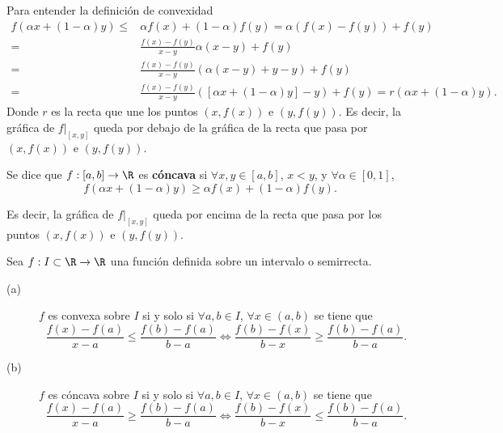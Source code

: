 \begin{observation}
\normalfont Para entender la definición de convexidad
\[
\begin{split}
	f\left(\alpha x + \left(1-\alpha \right)y\right) \leq & \alpha f\left(x\right) + \left(1-\alpha \right)f\left(y\right) =  \alpha \left(f\left(x\right)-f\left(y\right)\right) + f\left(y\right) \\
	= & \frac{f\left(x\right)-f\left(y\right)}{x-y}\alpha\left(x-y\right) + f\left(y\right) \\
	= & \frac{f\left(x\right)-f\left(y\right)}{x-y}\left(\alpha\left(x-y\right)+y-y\right) + f\left(y\right) \\
	= & \frac{f\left(x\right)-f\left(y\right)}{x-y}\left( \left[\alpha x + \left(1-\alpha \right)y\right] -y\right) + f\left(y\right) = r\left(\alpha x + \left(1-\alpha\right)y\right).
\end{split}
\]
Donde $\displaystyle r $ es la recta que une los puntos $\displaystyle \left(x,f\left(x\right)\right) $ e $\displaystyle \left(y,f\left(y\right)\right) $.
Es decir, la gráfica de $\displaystyle f|_{\left[x,y\right] } $ queda por debajo de la gráfica de la recta que pasa por $\displaystyle \left(x, f\left(x\right)\right) $ e $\displaystyle \left(y, f\left(y\right)\right) $.
\end{observation}
\begin{fdefinition}[]
	\normalfont Se dice que $\displaystyle f:\left[a,b\right] \to \R $ es \textbf{cóncava} si $\displaystyle \forall x,y \in [a,b] $, $\displaystyle x<y $, y $\displaystyle \forall \alpha \in [0,1] $, 
	\[ f\left(\alpha x + \left(1-\alpha \right)y\right) \geq \alpha f\left(x\right) + \left(1-\alpha \right)f\left(y\right) .\]
\end{fdefinition}
Es decir, la gráfica de $\displaystyle f|_{[x,y]} $ queda por encima de la recta que pasa por los puntos $\displaystyle \left(x,f\left(x\right)\right) $ e $\displaystyle \left(y,f\left(y\right)\right) $.
\begin{fprop}[]
\normalfont Sea $\displaystyle f: I \subset \R \to \R $ una función definida sobre un intervalo o semirrecta. 
\begin{description}
\item[(a)] $\displaystyle f $ es convexa sobre $\displaystyle I $ si y solo si $\displaystyle \forall a,b \in I $, $\displaystyle \forall x \in \left(a,b\right) $ se tiene que
	\[ \frac{f\left(x\right)-f\left(a\right)}{x-a} \leq \frac{f\left(b\right)-f\left(a\right)}{b-a} \iff \frac{f\left(b\right)-f\left(x\right)}{b-x} \geq \frac{f\left(b\right)-f\left(a\right)}{b-a}.\]
	
\item[(b)] $\displaystyle f $ es cóncava sobre $\displaystyle I $ si y solo si $\displaystyle \forall a,b \in I $, $\displaystyle \forall x \in \left(a,b\right) $ se tiene que 
	\[\frac{f\left(x\right)-f\left(a\right)}{x-a} \geq \frac{f\left(b\right)-f\left(a\right)}{b-a} \iff \frac{f\left(b\right)-f\left(x\right)}{b-x} \leq \frac{f\left(b\right)-f\left(a\right)}{b-a} .\]	
\end{description}
\end{fprop}

